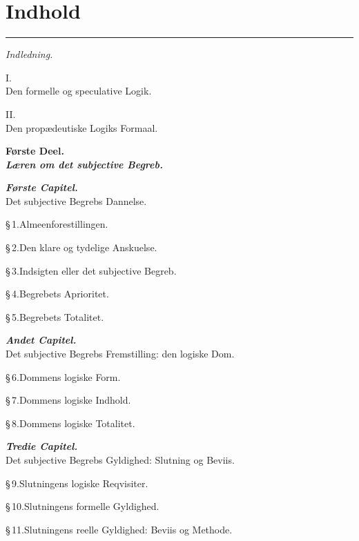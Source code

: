 \documentclass[12pt]{book}
\begin{document}
\chapter*{Indhold}
\begin{center}\rule{0.35\linewidth}{0.4pt}\end{center}
{\small\setlength{\parindent}{0pt}\setlength{\parskip}{2pt}

\begin{center}\emph{Indledning.}\end{center}
\begin{center}I.\\ Den formelle og speculative Logik.\end{center}
\begin{center}II.\\ Den propædeutiske Logiks Formaal.\end{center}

\begin{center}{\bfseries Første Deel.}\\ {\bfseries\emph{Læren om det subjective Begreb.}}\end{center}

\begin{center}{\bfseries\emph{Første Capitel.}}\\ Det subjective Begrebs Dannelse.\end{center}
\S\,1.\quad Almeenforestillingen.\par
\S\,2.\quad Den klare og tydelige Anskuelse.\par
\S\,3.\quad Indsigten eller det subjective Begreb.\par
\S\,4.\quad Begrebets Aprioritet.\par
\S\,5.\quad Begrebets Totalitet.\par

\begin{center}{\bfseries\emph{Andet Capitel.}}\\ Det subjective Begrebs Fremstilling: den logiske Dom.\end{center}
\S\,6.\quad Dommens logiske Form.\par
\S\,7.\quad Dommens logiske Indhold.\par
\S\,8.\quad Dommens logiske Totalitet.\par

\begin{center}{\bfseries\emph{Tredie Capitel.}}\\ Det subjective Begrebs Gyldighed: Slutning og Beviis.\end{center}
\S\,9.\quad Slutningens logiske Reqvisiter.\par
\S\,10.\quad Slutningens formelle Gyldighed.\par
\S\,11.\quad Slutningens reelle Gyldighed: Beviis og Methode.\par

}
\end{document}
